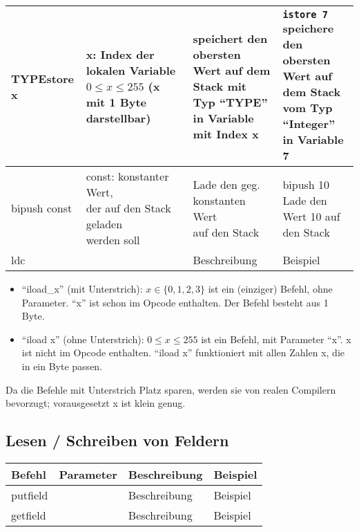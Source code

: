 \begin{table}[h]
\begin{tabular}{l|l|l|l}
		\textbf{TYPE}store x	& \multlineTable{x: Index der lokalen\\ Variable $0 \leq x \leq 255$\\ (x mit 1 Byte darstellbar) }	&	\multlineTable{speichert den obersten Wert auf dem\\ Stack mit Typ \enquote{TYPE} in Variable\\ mit Index x}	& \multlineTable{\texttt{istore 7}\\ speichere den obersten Wert auf\\ dem Stack vom Typ \enquote{Integer}\\ in Variable 7}	\\ \hline	
		
		bipush const& \multlineTable{const: konstanter Wert,\\ der auf den Stack geladen\\ werden soll} & \multlineTable{Lade den geg. konstanten Wert\\ auf den Stack} & \multlineTable{bipush 10\\ Lade den Wert 10 auf den Stack} \\ \hline	
		
		ldc & \open  & Beschreibung & Beispiel \\ \hline
	\end{tabular}
\end{table}
\begin{itemize}
	\item \enquote{iload\_x} (mit Unterstrich): $x \in \{ 0,1,2,3 \}$ ist ein (einziger) Befehl, ohne Parameter. \enquote{x} ist schon im Opcode enthalten. Der Befehl besteht aus 1 Byte.
	\item \enquote{iload x} (ohne Unterstrich): $0 \leq x \leq 255$ ist ein Befehl, mit Parameter \enquote{x}. x ist nicht im Opcode enthalten. \enquote{iload x} funktioniert mit allen Zahlen x, die in ein Byte passen.
\end{itemize}
Da die Befehle mit Unterstrich Platz sparen, werden sie von realen Compilern bevorzugt; vorausgesetzt x ist klein genug.

\subsection{Lesen / Schreiben von Feldern}
\begin{table}[h]
	\centering
	\label{my-label}
	\begin{tabular}{l|l|l|l}
		Befehl & Parameter & Beschreibung & Beispiel \\ \hline
		
		putfield & \open & Beschreibung & Beispiel \\ \hline	
		
		getfield & \open & Beschreibung & Beispiel \\ \hline		
		
	\end{tabular}
\end{table}

